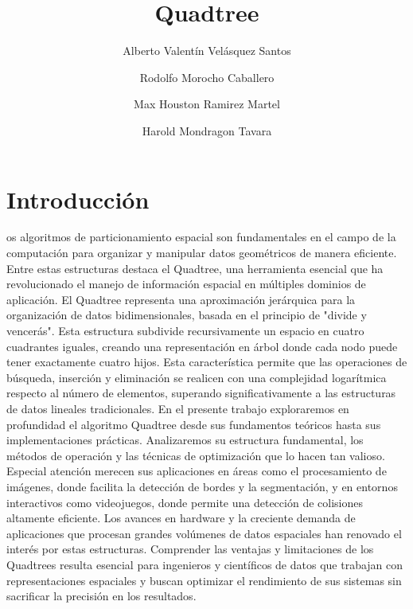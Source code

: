 \documentclass[9pt,a4paper,twoside]{rho-class/rho}
\title{ Quadtree }
\author[,$\dagger$]{Alberto Valentín Velásquez Santos}
\author[,$\dagger$]{Rodolfo Morocho Caballero}
\author[,$\dagger$]{Max Houston Ramirez Martel}
\author[,$\dagger$]{Harold Mondragon Tavara}
\affil[$\dagger$]{Estos autores contribuyeron igualmente a este trabajo.}
\begin{document}
	
    \maketitle
    \section{Introducción}

        os algoritmos de particionamiento espacial son fundamentales en el campo de la computación para organizar y manipular datos geométricos de manera eficiente. Entre estas estructuras destaca el Quadtree, una herramienta esencial que ha revolucionado el manejo de información espacial en múltiples dominios de aplicación.
        El Quadtree representa una aproximación jerárquica para la organización de datos bidimensionales, basada en el principio de "divide y vencerás". Esta estructura subdivide recursivamente un espacio en cuatro cuadrantes iguales, creando una representación en árbol donde cada nodo puede tener exactamente cuatro hijos. Esta característica permite que las operaciones de búsqueda, inserción y eliminación se realicen con una complejidad logarítmica respecto al número de elementos, superando significativamente a las estructuras de datos lineales tradicionales.
        En el presente trabajo exploraremos en profundidad el algoritmo Quadtree desde sus fundamentos teóricos hasta sus implementaciones prácticas. Analizaremos su estructura fundamental, los métodos de operación y las técnicas de optimización que lo hacen tan valioso. Especial atención merecen sus aplicaciones en áreas como el procesamiento de imágenes, donde facilita la detección de bordes y la segmentación, y en entornos interactivos como videojuegos, donde permite una detección de colisiones altamente eficiente.
        Los avances en hardware y la creciente demanda de aplicaciones que procesan grandes volúmenes de datos espaciales han renovado el interés por estas estructuras. Comprender las ventajas y limitaciones de los Quadtrees resulta esencial para ingenieros y científicos de datos que trabajan con representaciones espaciales y buscan optimizar el rendimiento de sus sistemas sin sacrificar la precisión en los resultados.
\end{document}
